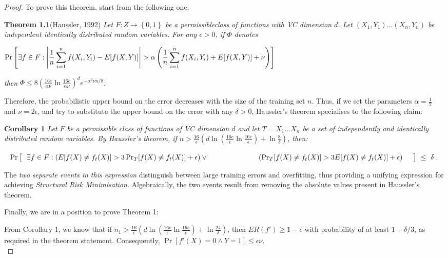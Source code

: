 \documentclass[12pt,twoside,notitlepage,amsart]{report} %
\begin{document}
	\begin{proof} To prove this theorem, start from the following one:
	
	\textbf{Theorem 1.1}(Haussler, 1992) \emph{Let $F: Z \rightarrow \left\{ 0,1 \right\}$ be a permissible\footnotemark[1] class of functions with VC dimension $d$. Let $ (X_1, Y_1) \ldots (X_n, Y_n) $ be independent identically distributed random variables. For any $\epsilon > 0$, if $\Phi$ denotes}
	
	$
	\displaystyle \small{\Pr\left[ \exists f \in F: \left| \frac{1}{n} \sum_{i=1}^{n}{f(X_i, Y_i)} - E[f(X,Y)] \right| > \alpha \left( \frac{1}{n} \sum_{i=1}^{n}{f(X_i, Y_i)} + E[f(X,Y)] + \nu \right) \right] } 
	$
	
	\emph{\phantom{aaaaaaaaaaa} then} $\displaystyle \Phi \leq 8 \left( \frac{16e}{\alpha \nu} \ln\frac{16e}{\alpha \nu} \right)^{d} e^{- \alpha^2 \nu n / 8 }$. 
	
	Therefore, the probabilistic upper bound on the error decreases with the size of the training set $n$. Thus, if we set the parameters $\alpha = \frac{1}{2} $ and $\nu =  2 \epsilon$, and try to substitute the upper bound on the error with any $\delta>0$, Haussler's theorem specialises to the following claim:
	
	\textbf{Corollary 1} \emph{Let $F$ be a permissible class of functions of VC dimension $d$ and let $ T = X_1 \ldots X_n $ be a set of independently and identically distributed random variables. By Haussler's theorem, if $n > \frac{16}{\epsilon} \left( d \ln( \frac{16e}{\epsilon}\ln\frac{16e}{\epsilon}) + \ln\frac{8}{\delta} \right)$, then:} 
	
	$\phantom{a} \Pr\big[ \ \ \exists f \in F:  \left(  E[f(X) \neq f_t(X)] > 3 \Pr_{T}[f(X) \neq f_t(X)] + \epsilon \right) \vee \\ \phantom{aaaaaaaaaaaaa} \left( \Pr_{T}[f(X) \neq f_t(X)] > 3 E[f(X) \neq f_t(X)] + \epsilon \right) \ \ \ \ \big] \ \displaystyle \leq \ \delta$.
	
	The \emph{two separate events in this expression} distinguish between large training errors and overfitting, thus providing a unifying expression for achieving \emph{Structural Risk Minimisation}. Algebraically, the two events result from removing the absolute values present in Haussler's theorem. 
	
	Finally, we are in a position to prove Theorem 1:  
	
	From Corollary 1, we know that if $n_1 > \frac{16}{\epsilon} \left( d \ln( \frac{16e}{\epsilon}\ln\frac{16e}{\epsilon}) + \ln\frac{24}{\delta} \right)$, then $ \boxed{ ER(f') \geq 1 - \epsilon } $ with probability of at least $1 - \delta / 3$, as required in the theorem statement. Consequently, $\Pr[f'(X)=0 \wedge Y = 1] \leq \epsilon \nu$. \\
	

\end{proof}
\end{document}
